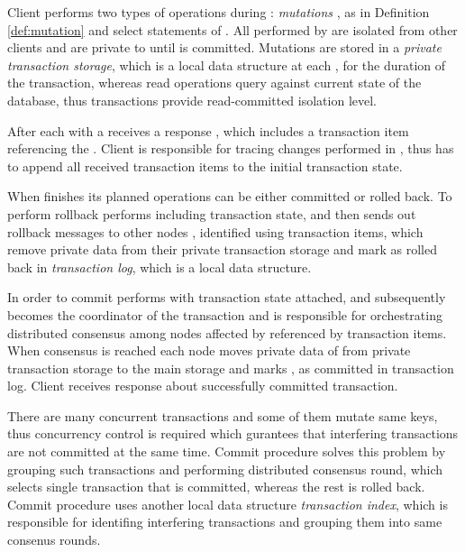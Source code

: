 
Client \client performs two types of operations during \transaction: \emph{mutations} \mutations, as in Definition \ref{def:mutation} and select statements of \kv. All   performed by \client are isolated from other clients and are private to \transaction until \transaction is committed. Mutations are stored in a \emph{private transaction storage}, which is a local data structure at each , for the duration of the transaction, whereas read operations query against current state of the database, thus transactions provide read-committed isolation level.

After each  with a  \client receives a response , which includes a transaction item referencing the . Client is responsible for tracing changes performed in \transaction, thus \client has to append all received transaction items to the initial transaction state.

When \client finishes its planned operations \transaction can be either committed or rolled back. To perform rollback \client performs  including transaction state, and then  sends out rollback messages to other nodes , identified using transaction items, which remove private data from their private transaction storage and mark \transaction as rolled back in \emph{transaction log}, which is a local data structure.

In order to commit \transaction \client performs  with transaction state attached, and subsequently  becomes the coordinator of the transaction and is responsible for orchestrating distributed consensus among nodes affected by \transaction referenced by transaction items. When consensus is reached each node moves private data of \transaction from private transaction storage to the main storage and marks \transaction, as committed in transaction log. Client receives response  about successfully committed transaction.

There are many concurrent transactions and some of them mutate same keys, thus concurrency control is required which gurantees that interfering transactions are not committed at the same time. Commit procedure solves this problem by grouping such transactions and performing distributed consensus round, which selects single transaction that is committed, whereas the rest is rolled back.
Commit procedure uses another local data structure \emph{transaction index}, which is responsible for identifing interfering transactions and grouping them into same consenus rounds.

